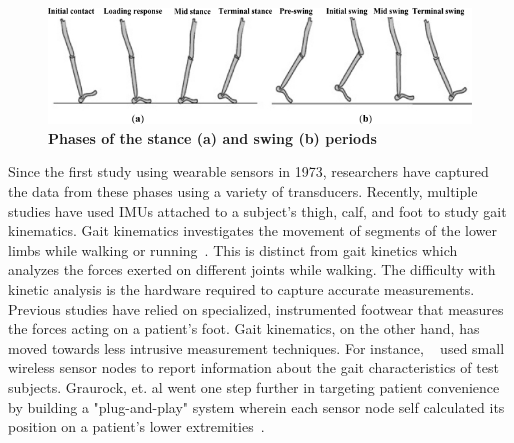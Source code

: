 \documentclass[conference]{IEEEtran}
\begin{document}
\begin{figure}[h]
  \centering
  \includegraphics[width=0.9\columnwidth]{figs/phases}
  \caption{{\bf Phases of the stance (a) and swing (b) periods~\cite{gaits} }}
  \label{fig:phases}
\end{figure}

Since the first study using wearable sensors in 1973, researchers have captured the data
from these phases using a variety of transducers. Recently, multiple studies have used
IMUs attached to a subject’s thigh, calf, and foot to study gait kinematics. Gait
kinematics investigates the movement of segments of the lower limbs while walking or
running~\cite{run}. This is distinct from gait kinetics which analyzes the forces exerted on
different joints while walking. The difficulty with kinetic analysis is the hardware
required to capture accurate measurements. Previous studies have relied on specialized,
instrumented footwear that measures the forces acting on a patient’s foot. Gait
kinematics, on the other hand, has moved towards less intrusive measurement techniques.
For instance, ~\cite{walkers} used small wireless sensor nodes to report information about the gait
characteristics of test subjects. Graurock, et. al went one step further in targeting
patient convenience by building a "plug-and-play" system wherein each sensor node self
calculated its position on a patient's lower extremities~\cite{pairing}.  
\end{document}
